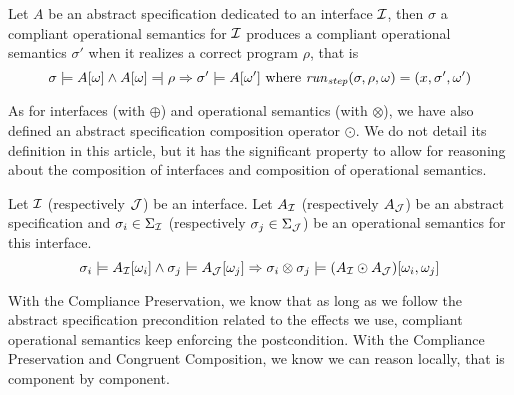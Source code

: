 \begin{theorem}
  Let $A$ be an abstract specification dedicated to an interface $\mathcal{I}$, then
  $\sigma$ a compliant operational semantics for $\mathcal{I}$ produces a compliant
  operational semantics $\sigma'$ when it realizes a correct program $\rho$,
  that is
  \[
    \sigma \models A[\omega] \wedge A[\omega] \modelssym \rho \Rightarrow
    \sigma' \models A[\omega'] \text{ where }\func{run}_{\func{step}}(\sigma,
    \rho, \omega) = (x, \sigma', \omega')
  \]
\end{theorem}

As for interfaces (with $\oplus$) and operational semantics (with $\otimes$), we
have also defined an abstract specification composition operator $\odot$.
%
We do not detail its definition in this article, but it has the significant
property to allow for reasoning about the composition of interfaces and
composition of operational semantics.

\begin{theorem}
  Let $\mathcal{I}$ (respectively $\mathcal{J}$) be an interface.
  Let $A_{\mathcal{I}}$ (respectively $A_{\mathcal{J}}$) be an abstract specification and
  $\sigma_i \in \Sigma_{\mathcal{I}}$ (respectively $\sigma_j \in \Sigma_{\mathcal{J}}$) be an
  operational semantics for this interface.
  \[ \sigma_i \models A_{\mathcal{I}}[\omega_i] \wedge \sigma_j \models A_{\mathcal{J}}[\omega_j]
    \Rightarrow \sigma_i \otimes \sigma_j \models (A_{\mathcal{I}} \odot
    A_{\mathcal{J}})[\omega_i, \omega_j]
  \]
\end{theorem}


With the Compliance Preservation, we know that as long as we follow the abstract
specification precondition related to the effects we use, compliant operational
semantics keep enforcing the postcondition.
%
With the Compliance Preservation and Congruent Composition, we know we can
reason locally, that is component by component.

